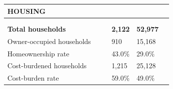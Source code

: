 \documentclass[9pt]{report}
\begin{document}
\vspace{12pt}
\setlength{\tabcolsep}{.01in} %
\begin{tabular}{p{.10in}p{.10in}p{.10in}p{3.7in}>{\hfill}p{.85in}>{\hfill}p{.85in}>{\hfill}p{.85in}>{\hfill}p{.85in}p{0.1in}}
\multicolumn{9}{l}{\parbox{7.1in}{\raggedright{\large{\strut\textbf{HOUSING}\strut}}}} \\ 
\hline
\multicolumn{4}{l}{\parbox{3.5in}{\raggedright{\textbf{}}}} & \multicolumn{1}{r}{\parbox{.85in}{\strut\raggedleft{\textbf{}\strut}}} & \multicolumn{1}{r}{\parbox{.85in}{\strut\raggedleft{\textbf{}\strut}}} & \multicolumn{1}{r}{\parbox{.85in}{\strut{}}} & \multicolumn{1}{r}{\parbox{.85in}{\strut{}}} & \\ 
\multicolumn{9}{l}{} \\ 
\multicolumn{4}{l}{\parbox{3.5in}{\strut\raggedright{\textbf{Total households}\strut}}} & \textbf{} & \textbf{} & \textbf{2,122} & \textbf{52,977} & \textbf{} \\ 
\multicolumn{4}{l}{\parbox{3.6in}{\strut\raggedright{{Owner-occupied households}}\strut}} &  &  & 910 & 15,168 & \multicolumn{1}{l}{}  \\ 
\multicolumn{4}{l}{\parbox{3.6in}{\strut\raggedright{{Homeownership rate}}\strut}} &  &  & 43.0\% & 29.0\% & \multicolumn{1}{l}{}  \\ 
\multicolumn{4}{l}{\parbox{3.6in}{\strut\raggedright{{Cost-burdened households}}\strut}} &  &  & 1,215 & 25,128 & \multicolumn{1}{l}{}  \\ 
\multicolumn{4}{l}{\parbox{3.6in}{\strut\raggedright{{Cost-burden rate}}\strut}} &  &  & 59.0\% & 49.0\% & \multicolumn{1}{l}{}  \\ 

\end{tabular}
\setlength{\tabcolsep}{6pt} %
\end{document}
